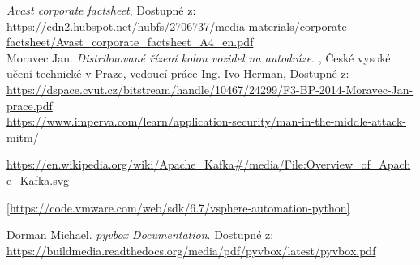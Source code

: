 \documentclass[thesis=M,czech,hidelinks]{FITthesis}[2013/05/06]
\begin{document}


\begin{thebibliography}{9}

    \textit{Avast corporate factsheet}, Dostupné z: \\       \url{https://cdn2.hubspot.net/hubfs/2706737/media-materials/corporate-factsheet/Avast_corporate_factsheet_A4_en.pdf} \\
       	
       	Moravec Jan. \textit{Distribuované řízení kolon vozidel na autodráze}. , České vysoké učení technické v Praze, vedoucí práce Ing. Ivo Herman, Dostupné z: \\    \url{https://dspace.cvut.cz/bitstream/handle/10467/24299/F3-BP-2014-Moravec-Jan-prace.pdf} \\
       	
    \url{https://www.imperva.com/learn/application-security/man-in-the-middle-attack-mitm/}


	\url{https://en.wikipedia.org/wiki/Apache_Kafka#/media/File:Overview_of_Apache_Kafka.svg}
	
	\url{[https://code.vmware.com/web/sdk/6.7/vsphere-automation-python]}
	
	Dorman Michael. \textit{pyvbox Documentation}.  Dostupné z: \\
	\url{https://buildmedia.readthedocs.org/media/pdf/pyvbox/latest/pyvbox.pdf}
	
\end{thebibliography}

\appendix



\end{document}
